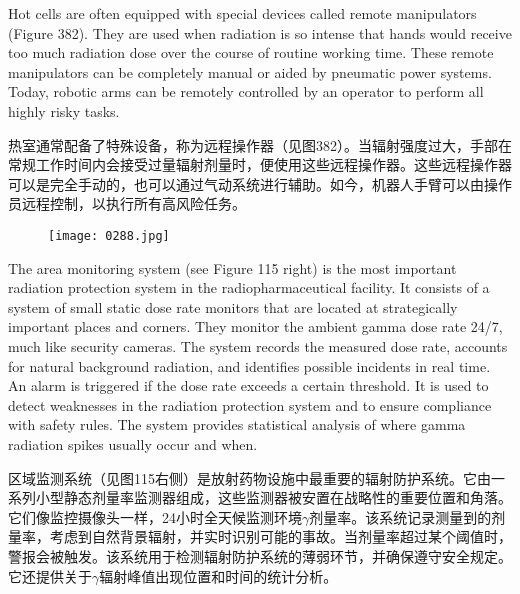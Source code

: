 \documentclass[dvipsnames, svgnames,a4paper,11pt]{article}
\begin{document}
Hot cells are often equipped with special devices called remote manipulators (Figure 382). They are used when radiation is so intense that hands would receive too much radiation dose over the course of routine working time. These remote manipulators can be completely manual or aided by pneumatic power systems. Today, robotic arms can be remotely controlled by an operator to perform all highly risky tasks.


热室通常配备了特殊设备，称为远程操作器（见图382）。当辐射强度过大，手部在常规工作时间内会接受过量辐射剂量时，便使用这些远程操作器。这些远程操作器可以是完全手动的，也可以通过气动系统进行辅助。如今，机器人手臂可以由操作员远程控制，以执行所有高风险任务。

\begin{figure}[h]
    \centering
    \texttt{[image: 0288.jpg]} 
     \label{fig382}
\end{figure}


The area monitoring system (see Figure 115 right) is the most important radiation protection system in the radiopharmaceutical facility. It consists of a system of small static dose rate monitors that are located at strategically important places and corners. They monitor the ambient gamma dose rate 24/7, much like security cameras. The system records the measured dose rate, accounts for natural background radiation, and identifies possible incidents in real time. An alarm is triggered if the dose rate exceeds a certain threshold. It is used to detect weaknesses in the radiation protection system and to ensure compliance with safety rules. The system provides statistical analysis of where gamma radiation spikes usually occur and when.

区域监测系统（见图115右侧）是放射药物设施中最重要的辐射防护系统。它由一系列小型静态剂量率监测器组成，这些监测器被安置在战略性的重要位置和角落。它们像监控摄像头一样，24小时全天候监测环境$\gamma$剂量率。该系统记录测量到的剂量率，考虑到自然背景辐射，并实时识别可能的事故。当剂量率超过某个阈值时，警报会被触发。该系统用于检测辐射防护系统的薄弱环节，并确保遵守安全规定。它还提供关于$\gamma$辐射峰值出现位置和时间的统计分析。
\end{document}
